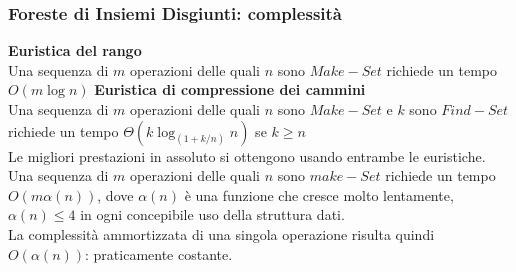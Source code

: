 \subsubsection{Foreste di Insiemi Disgiunti: complessità}
\textbf{Euristica del rango}\\
Una sequenza di $m$ operazioni delle quali $n$ sono $Make-Set$ richiede un tempo \textbf{$O(m \log n)$}
\textbf{Euristica di compressione dei cammini}\\
Una sequenza di $m$ operazioni delle quali $n$ sono $Make-Set$ e $k$ sono $Find-Set$ richiede un tempo 
\textbf{$\Theta(k \log_{(1+k/n)} n)$} se $k \ge n$\\
Le migliori prestazioni in assoluto si ottengono usando entrambe le euristiche.\\
Una sequenza di $m$ operazioni delle quali $n$ sono $make-Set$ richiede un tempo \textbf{$O(m \alpha(n))$}, dove $\alpha(n)$ è una funzione che 
cresce molto lentamente, $\alpha(n) \le 4$ in ogni concepibile uso della struttura dati.\\
La complessità ammortizzata di una singola operazione risulta quindi $O(\alpha(n))$: praticamente costante.
